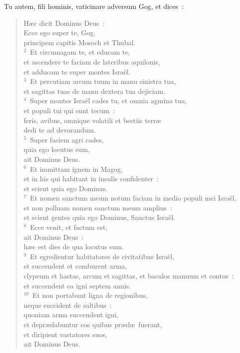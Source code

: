 \lettrine[lines=10,image=true,loversize=0.05,lraise=-0.03]{T}{}u autem, fili hominis, vaticinare adversum Gog, et dices~: \begin{flushleft}\begin{verse}\vspace{6pt}H\ae c dicit Dominus Deus~:\\ Ecce ego super te, Gog,\\ principem capitis Mosoch et Thubal.\\
${}^{2}$~Et circumagam te, et educam te,\\ et ascendere te faciam de lateribus aquilonis,\\ et adducam te super montes Isra\"el.\\
${}^{3}$~Et percutiam arcum tuum in manu sinistra tua,\\ et sagittas tuas de manu dextera tua dejiciam.\\
${}^{4}$~Super montes Isra\"el cades tu, et omnia agmina tua,\\ et populi tui qui sunt tecum~:\\ feris, avibus, omnique volatili et bestiis terr\ae \\ dedi te ad devorandum.\\
${}^{5}$~Super faciem agri cades,\\ quia ego locutus sum,\\ ait Dominus Deus.\\
${}^{6}$~Et immittam ignem in Magog,\\ et in his qui habitant in insulis confidenter~:\\ et scient quia ego Dominus.\\
${}^{7}$~Et nomen sanctum meum notum faciam in medio populi mei Isra\"el,\\ et non polluam nomen sanctum meum amplius~:\\ et scient gentes quia ego Dominus, Sanctus Isra\"el.\\
${}^{8}$~Ecce venit, et factum est,\\ ait Dominus Deus~:\\ h\ae c est dies de qua locutus sum.\\
${}^{9}$~Et egredientur habitatores de civitatibus Isra\"el,\\ et succendent et comburent arma,\\ clypeum et hastas, arcum et sagittas, et baculos manuum et contos~:\\ et succendent ea igni septem annis.\\
${}^{10}$~Et non portabunt ligna de regionibus,\\ neque succident de saltibus~:\\ quoniam arma succendent igni,\\ et depr\ae dabuntur eos quibus pr\ae d\ae\ fuerant,\\ et diripient vastatores suos,\\ ait Dominus Deus.\end{verse}\end{flushleft}


